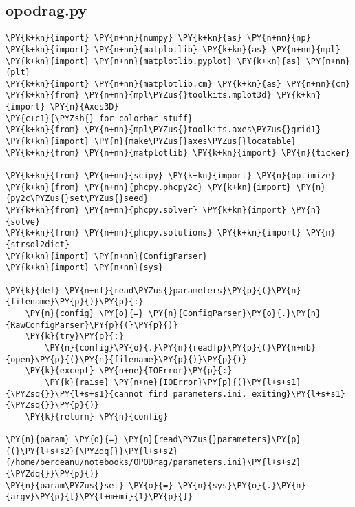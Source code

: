 


\subsection{opodrag.py}\label{subsec:opodrag}
\begin{Verbatim}[commandchars=\\\{\}]
\PY{k+kn}{import} \PY{n+nn}{numpy} \PY{k+kn}{as} \PY{n+nn}{np}
\PY{k+kn}{import} \PY{n+nn}{matplotlib} \PY{k+kn}{as} \PY{n+nn}{mpl}
\PY{k+kn}{import} \PY{n+nn}{matplotlib.pyplot} \PY{k+kn}{as} \PY{n+nn}{plt}
\PY{k+kn}{import} \PY{n+nn}{matplotlib.cm} \PY{k+kn}{as} \PY{n+nn}{cm}
\PY{k+kn}{from} \PY{n+nn}{mpl\PYZus{}toolkits.mplot3d} \PY{k+kn}{import} \PY{n}{Axes3D}
\PY{c+c1}{\PYZsh{} for colorbar stuff}
\PY{k+kn}{from} \PY{n+nn}{mpl\PYZus{}toolkits.axes\PYZus{}grid1} \PY{k+kn}{import} \PY{n}{make\PYZus{}axes\PYZus{}locatable}
\PY{k+kn}{from} \PY{n+nn}{matplotlib} \PY{k+kn}{import} \PY{n}{ticker}

\PY{k+kn}{from} \PY{n+nn}{scipy} \PY{k+kn}{import} \PY{n}{optimize}
\PY{k+kn}{from} \PY{n+nn}{phcpy.phcpy2c} \PY{k+kn}{import} \PY{n}{py2c\PYZus{}set\PYZus{}seed}
\PY{k+kn}{from} \PY{n+nn}{phcpy.solver} \PY{k+kn}{import} \PY{n}{solve}
\PY{k+kn}{from} \PY{n+nn}{phcpy.solutions} \PY{k+kn}{import} \PY{n}{strsol2dict}
\PY{k+kn}{import} \PY{n+nn}{ConfigParser}
\PY{k+kn}{import} \PY{n+nn}{sys}

\PY{k}{def} \PY{n+nf}{read\PYZus{}parameters}\PY{p}{(}\PY{n}{filename}\PY{p}{)}\PY{p}{:}
    \PY{n}{config} \PY{o}{=} \PY{n}{ConfigParser}\PY{o}{.}\PY{n}{RawConfigParser}\PY{p}{(}\PY{p}{)}
    \PY{k}{try}\PY{p}{:}
        \PY{n}{config}\PY{o}{.}\PY{n}{readfp}\PY{p}{(}\PY{n+nb}{open}\PY{p}{(}\PY{n}{filename}\PY{p}{)}\PY{p}{)}
    \PY{k}{except} \PY{n+ne}{IOError}\PY{p}{:}
        \PY{k}{raise} \PY{n+ne}{IOError}\PY{p}{(}\PY{l+s+s1}{\PYZsq{}}\PY{l+s+s1}{cannot find parameters.ini, exiting}\PY{l+s+s1}{\PYZsq{}}\PY{p}{)}
    \PY{k}{return} \PY{n}{config}

\PY{n}{param} \PY{o}{=} \PY{n}{read\PYZus{}parameters}\PY{p}{(}\PY{l+s+s2}{\PYZdq{}}\PY{l+s+s2}{/home/berceanu/notebooks/OPODrag/parameters.ini}\PY{l+s+s2}{\PYZdq{}}\PY{p}{)}
\PY{n}{param\PYZus{}set} \PY{o}{=} \PY{n}{sys}\PY{o}{.}\PY{n}{argv}\PY{p}{[}\PY{l+m+mi}{1}\PY{p}{]}


\end{Verbatim}

